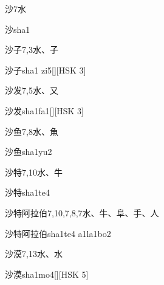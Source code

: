 \begin{entry}{沙}{7}{⽔}
  \begin{phonetics}{沙}{sha1}
  \end{phonetics}
\end{entry}

\begin{entry}{沙子}{7,3}{⽔、⼦}
  \begin{phonetics}{沙子}{sha1 zi5}[][HSK 3]
  \end{phonetics}
\end{entry}

\begin{entry}{沙发}{7,5}{⽔、⼜}
  \begin{phonetics}{沙发}{sha1fa1}[][HSK 3]
  \end{phonetics}
\end{entry}

\begin{entry}{沙鱼}{7,8}{⽔、⿂}
  \begin{phonetics}{沙鱼}{sha1yu2}
  \end{phonetics}
\end{entry}

\begin{entry}{沙特}{7,10}{⽔、⽜}
  \begin{phonetics}{沙特}{sha1te4}
  \end{phonetics}
\end{entry}

\begin{entry}{沙特阿拉伯}{7,10,7,8,7}{⽔、⽜、⾩、⼿、⼈}
  \begin{phonetics}{沙特阿拉伯}{sha1te4 a1la1bo2}
  \end{phonetics}
\end{entry}

\begin{entry}{沙漠}{7,13}{⽔、⽔}
  \begin{phonetics}{沙漠}{sha1mo4}[][HSK 5]
  \end{phonetics}
\end{entry}

